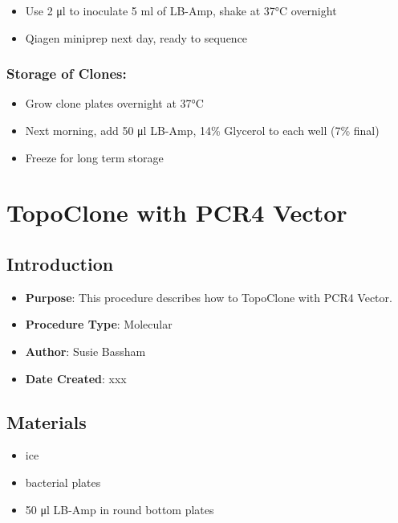 \documentclass[
  letterpaper,
  DIV=11,
  numbers=noendperiod]{scrreprt}
\providecommand{\tightlist}{%
  \setlength{\itemsep}{0pt}\setlength{\parskip}{0pt}}\usepackage{longtable,booktabs,array}
\begin{document}
\begin{itemize}
\tightlist
\item
  Use 2 μl to inoculate 5 ml of LB-Amp, shake at 37°C overnight
\item
  Qiagen miniprep next day, ready to sequence
\end{itemize}

\hypertarget{storage-of-clones}{%
\subsection{Storage of Clones:}\label{storage-of-clones}}

\begin{itemize}
\tightlist
\item
  Grow clone plates overnight at 37°C
\item
  Next morning, add 50 μl LB-Amp, 14\% Glycerol to each well (7\% final)
\item
  Freeze for long term storage
\end{itemize}

\hypertarget{sec-molecular-TopoClone_PCR4}{%
\chapter{TopoClone with PCR4
Vector}\label{sec-molecular-TopoClone_PCR4}}

\hypertarget{introduction-26}{%
\section{Introduction}\label{introduction-26}}

\begin{itemize}
\item
  \textbf{Purpose}: This procedure describes how to TopoClone with PCR4
  Vector.
\item
  \textbf{Procedure Type}: Molecular
\item
  \textbf{Author}: Susie Bassham
\item
  \textbf{Date Created}: xxx
\end{itemize}

\hypertarget{materials-26}{%
\section{Materials}\label{materials-26}}

\begin{itemize}
\item
  ice
\item
  bacterial plates
\item
  50 μl LB-Amp in round bottom plates
\end{itemize}
\end{document}
